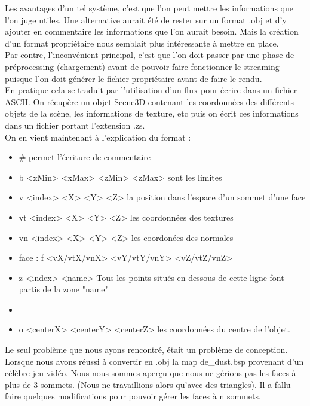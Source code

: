 \documentclass{report}
\begin{document}
Les avantages d'un tel système, c'est que l'on peut mettre les informations que l'on juge utiles. Une alternative aurait été de rester sur un format .obj et d'y ajouter en commentaire les informations que l'on aurait besoin. Mais la création d'un format propriétaire nous semblait plus intéressante à mettre en place.\\

				
Par contre, l'inconvénient principal, c'est que l'on doit passer par une phase de préprocessing (chargement) avant de pouvoir faire fonctionner le streaming puisque l'on doit générer le fichier propriétaire avant de faire le rendu.\\

				En pratique cela se traduit par l'utilisation d'un flux pour écrire dans un fichier ASCII. On récupère un objet Scene3D contenant les coordonnées des différents objets de la scène, les informations de texture, etc puis on écrit ces informations dans un fichier portant l'extension .zs.\\

On en vient maintenant à l'explication du format :\\
\begin{itemize}
	\item  \# permet l'écriture de commentaire
	\item  b <xMin> <xMax> <zMin> <zMax> sont les limites
	\item v <index> <X> <Y> <Z> la position dans l'espace d'un sommet d'une face
	\item vt <index> <X> <Y> <Z> les coordonnées des textures
	\item vn <index> <X> <Y> <Z> les coordonées des normales
	\item face : f <vX/vtX/vnX> <vY/vtY/vnY> <vZ/vtZ/vnZ>
	\item z <index> <name> Tous les points situés en dessous de cette ligne font partis de la zone "name"
	\item\item o <centerX> <centerY> <centerZ> les coordonnées du centre de l'objet.
\end{itemize}
				Le seul problème que nous ayons rencontré, était un problème de conception. Lorsque nous avons réussi à convertir en .obj  la map de\_dust.bsp provenant d'un célèbre jeu vidéo. Nous nous sommes aperçu que nous ne gérions pas les faces à plus de 3 sommets. (Nous ne travaillions alors qu'avec des triangles). Il a fallu faire quelques modifications pour pouvoir gérer les faces à n sommets.
\end{document}
